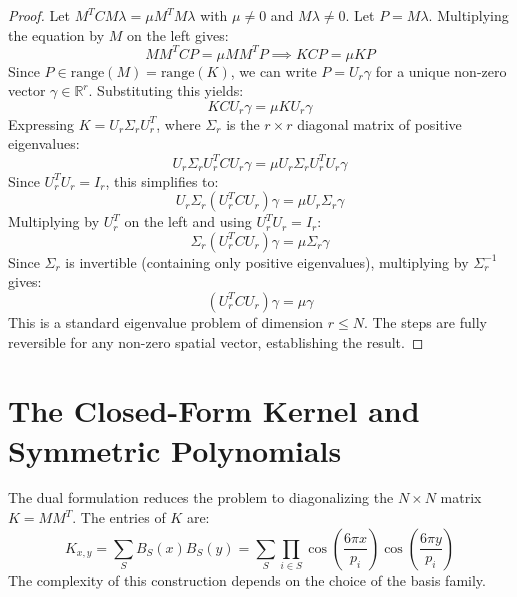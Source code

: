 \documentclass[10pt,twoside]{article}
\begin{document}
\begin{proof}
Let $M^T C M \lambda = \mu M^T M \lambda$ with $\mu \neq 0$ and $M\lambda \neq 0$. Let $P = M \lambda$. Multiplying the equation by $M$ on the left gives:
\begin{equation}
M M^T C P = \mu M M^T P \implies K C P = \mu K P
\end{equation}
Since $P \in \text{range}(M) = \text{range}(K)$, we can write $P = U_r \gamma$ for a unique non-zero vector $\gamma \in \mathbb{R}^r$. Substituting this yields:
\begin{equation}
K C U_r \gamma = \mu K U_r \gamma
\end{equation}
Expressing $K = U_r \Sigma_r U_r^T$, where $\Sigma_r$ is the $r \times r$ diagonal matrix of positive eigenvalues:
\begin{equation}
U_r \Sigma_r U_r^T C U_r \gamma = \mu U_r \Sigma_r U_r^T U_r \gamma
\end{equation}
Since $U_r^T U_r = I_r$, this simplifies to:
\begin{equation}
U_r \Sigma_r (U_r^T C U_r) \gamma = \mu U_r \Sigma_r \gamma
\end{equation}
Multiplying by $U_r^T$ on the left and using $U_r^T U_r = I_r$:
\begin{equation}
\Sigma_r (U_r^T C U_r) \gamma = \mu \Sigma_r \gamma
\end{equation}
Since $\Sigma_r$ is invertible (containing only positive eigenvalues), multiplying by $\Sigma_r^{-1}$ gives:
\begin{equation}
(U_r^T C U_r) \gamma = \mu \gamma
\end{equation}
This is a standard eigenvalue problem of dimension $r \le N$. The steps are fully reversible for any non-zero spatial vector, establishing the result.
\end{proof}

\section{The Closed-Form Kernel and Symmetric Polynomials} \label{sec:kernel}

The dual formulation reduces the problem to diagonalizing the $N \times N$ matrix $K = M M^T$. The entries of $K$ are:
\begin{equation}
K_{x, y} = \sum_{S} B_S(x) B_S(y) = \sum_{S} \prod_{i \in S} \cos\left(\frac{6\pi x}{p_i}\right) \cos\left(\frac{6\pi y}{p_i}\right)
\end{equation}
The complexity of this construction depends on the choice of the basis family.
\end{document}
